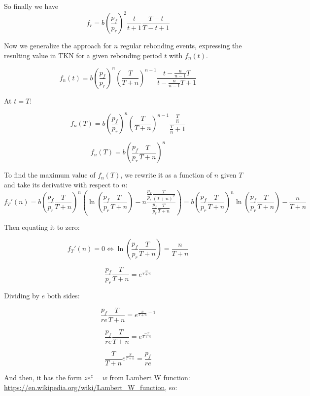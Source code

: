 \documentclass{article}
\begin{document}
So finally we have
\begin{equation}
  \label{eq:o-r}
f_r = b\left(\frac{p_f}{p_r}\right)^2\frac{t}{t+1}\frac{T-t}{T-t+1}
\end{equation}

Now we generalize the approach for $n$ regular rebonding events, expressing the resulting value in TKN for a given rebonding period $t$ with $f_n(t)$.

\begin{equation}
  \label{eq:n-rebond_1}
f_n(t) = b \left(\frac{p_f}{p_r}\right)^n \left(\frac{T}{T+n}\right)^{n-1} \frac{t - \frac{n}{n-1}T}{t - \frac{n}{n-1}T + 1}
\end{equation}

At $t=T$:

\begin{equation}
  \label{eq:n-rebond_2}
f_n(T) = b \left(\frac{p_f}{p_r}\right)^{n} \left(\frac{T}{T+n}\right)^{n-1} \frac{\frac{T}{n}}{\frac{T}{n} + 1}
\end{equation}

\begin{equation}
  \label{eq:n-rebond_3}
f_n(T) = b \left(\frac{p_f}{p_r} \frac{T}{T+n} \right)^{n}
\end{equation}

To find the maximum value of $f_n(T)$, we rewrite it as a function of $n$ given $T$ and take its derivative with respect to $n$:
\[
f_T'(n) = b \left(\frac{p_f}{p_r} \frac{T}{T+n}\right)^n \left(\ln\left(\frac{p_f}{p_r} \frac{T}{T+n}\right) - n \frac{\frac{p_f}{p_r} \frac{T}{(T+n)^2}}{\frac{p_f}{p_r} \frac{T}{T+n}}\right) = b \left(\frac{p_f}{p_r} \frac{T}{T+n}\right)^n \ln\left(\frac{p_f}{p_r} \frac{T}{T+n}\right) - \frac{n}{T+n}
\]

Then equating it to zero:

\[
f_T'(n) = 0 \iff \ln\left(\frac{p_f}{p_r} \frac{T}{T+n}\right) = \frac{n}{T+n}
\]

\[
\frac{p_f}{p_r} \frac{T}{T+n} = e^{\frac{n}{T+n}}
\]

Dividing by $e$ both sides:

\[
\frac{p_f}{re} \frac{T}{T+n} = e^{\frac{n}{T+n} - 1}
\]

\[
\frac{p_f}{re} \frac{T}{T+n} = e^{\frac{-T}{T+n}}
\]

\[
\frac{T}{T+n} e^{\frac{T}{T+n}} = \frac{p_f}{re} 
\]

And then, it has the form $z e^z = w$ from Lambert W function: \url{https://en.wikipedia.org/wiki/Lambert_W_function}, so:
\end{document}
